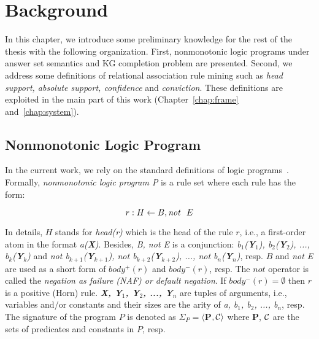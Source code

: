 \chapter{Background}
\label{chap:back}

In this chapter, we introduce some preliminary knowledge for the rest of the thesis with the following organization. First, nonmonotonic logic programs under answer set semantics and KG completion problem are presented. Second, we address some definitions of relational association rule mining such as \textit{head support, absolute support, confidence} and \textit{conviction}. These definitions are exploited in the main part of this work (Chapter~\ref{chap:frame} and~\ref{chap:system}).

\section{Nonmonotonic Logic Program}

In the current work, we rely on the standard definitions of logic programs~\cite{ref49}. Formally, \textit{nonmonotonic logic program P} is a rule set where each rule has the form:

\begin{equation}
r: H \leftarrow B, \mathit{not}~ \ E
\end{equation}
\label{rule3}

In details, $H$ stands for \textit{head(r)} which is the head of the rule $r$, i.e., a first-order atom in the format \textit{a(\textbf{X})}. Besides, \textit{B, not E} is a conjunction: \textit{b$_1$(\textbf{Y}$_1$), b$_2$(\textbf{Y}$_2$), ..., b$_k$(\textbf{Y}$_k$)} and \textit{not b$_{k+1}$(\textbf{Y}$_{k+1}$), not b$_{k+2}$(\textbf{Y}$_{k+2}$), ..., not b$_n$(\textbf{Y}$_n$)}, resp. $B$ and \textit{not E} are used as a short form of $body^+(r)$ and $body^-(r)$, resp. The $not$ operator is called the \textit{negation as failure (NAF) or default negation}. If $body^-(r) = \emptyset$ then $r$ is a positive (Horn) rule. \textit{\textbf{X, Y$_{1}$, Y$_{2}$, ..., Y$_{n}$}} are tuples of arguments, i.e., variables and/or constants and their sizes are the arity of \textit{a, b$_1$, b$_2$, ..., b$_n$}, resp. The signature of the program $P$ is denoted as $\Sigma_{P} = \langle$\textbf{P}$, \mathcal{C}\rangle$ where \textbf{P}, $\mathcal{C}$ are the sets of predicates and constants in $P$, resp.

